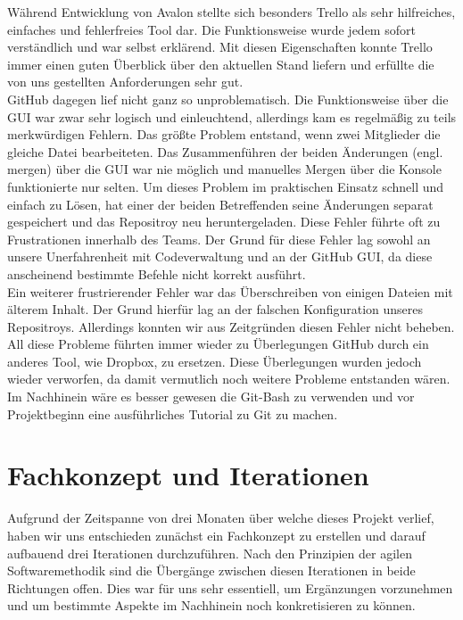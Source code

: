 Während Entwicklung von Avalon stellte sich besonders Trello als sehr hilfreiches, einfaches und fehlerfreies Tool dar. Die Funktionsweise wurde jedem sofort verständlich und war selbst erklärend. Mit diesen Eigenschaften konnte Trello immer einen guten Überblick über den aktuellen Stand liefern und erfüllte die von uns gestellten Anforderungen sehr gut.\\
GitHub dagegen lief nicht ganz so unproblematisch. Die Funktionsweise über die GUI war zwar sehr logisch und einleuchtend, allerdings kam es regelmäßig zu teils merkwürdigen Fehlern. Das größte Problem entstand, wenn zwei Mitglieder die gleiche Datei bearbeiteten. Das Zusammenführen der beiden Änderungen (engl. mergen) über die GUI war nie möglich und manuelles Mergen über die Konsole funktionierte nur selten. Um dieses Problem im praktischen Einsatz schnell und einfach zu Lösen, hat einer der beiden Betreffenden seine Änderungen separat gespeichert und das Repositroy neu heruntergeladen. Diese Fehler führte oft zu Frustrationen innerhalb des Teams. Der Grund für diese Fehler lag sowohl an unsere Unerfahrenheit mit Codeverwaltung und an der GitHub GUI, da diese anscheinend bestimmte Befehle nicht korrekt ausführt.\\
Ein weiterer frustrierender Fehler war das Überschreiben von einigen Dateien mit älterem Inhalt. Der Grund hierfür lag an der falschen Konfiguration unseres Repositroys. Allerdings konnten wir aus Zeitgründen diesen Fehler nicht beheben.\\
All diese Probleme führten immer wieder zu Überlegungen GitHub durch ein anderes Tool, wie Dropbox, zu ersetzen. Diese Überlegungen wurden jedoch wieder verworfen, da damit vermutlich noch weitere Probleme entstanden wären. Im Nachhinein wäre es besser gewesen die Git-Bash zu verwenden und vor Projektbeginn eine ausführliches Tutorial zu Git zu machen.

\section{Fachkonzept und Iterationen}

Aufgrund der Zeitspanne von drei Monaten über welche dieses Projekt verlief, haben wir uns entschieden zunächst ein Fachkonzept zu erstellen und darauf aufbauend drei Iterationen durchzuführen. Nach den Prinzipien der agilen Softwaremethodik sind die Übergänge zwischen diesen Iterationen in beide Richtungen offen. Dies war für uns sehr essentiell, um Ergänzungen vorzunehmen  und um bestimmte Aspekte im Nachhinein noch konkretisieren zu können.

